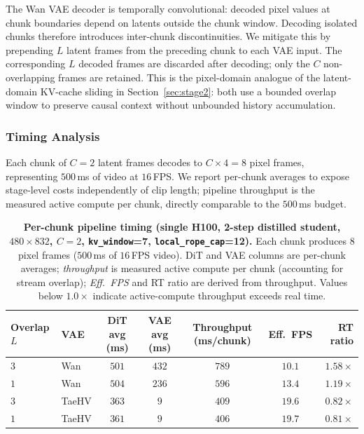 The Wan VAE decoder is temporally convolutional: decoded pixel values at chunk boundaries depend on latents outside the chunk window. Decoding isolated chunks therefore introduces inter-chunk discontinuities. We mitigate this by prepending $L$ latent frames from the preceding chunk to each VAE input. The corresponding $L$ decoded frames are discarded after decoding; only the $C$ non-overlapping frames are retained. This is the pixel-domain analogue of the latent-domain KV-cache sliding in Section~\ref{sec:stage2}: both use a bounded overlap window to preserve causal context without unbounded history accumulation.

\subsubsection{Timing Analysis}

Each chunk of $C{=}2$ latent frames decodes to $C \times 4 = 8$ pixel frames, representing $500$\,ms of video at $16$\,FPS. We report per-chunk averages to expose stage-level costs independently of clip length; pipeline throughput is the measured active compute per chunk, directly comparable to the $500$\,ms budget.

\begin{table}[h]
  \caption{\textbf{Per-chunk pipeline timing (single H100, 2-step distilled student, $480{\times}832$, $C{=}2$, \texttt{kv\_window}{=}7, \texttt{local\_rope\_cap}{=}12).} Each chunk produces $8$ pixel frames ($500$\,ms of $16$\,FPS video). DiT and VAE columns are per-chunk averages; \emph{throughput} is measured active compute per chunk (accounting for stream overlap); \emph{Eff.\ FPS} and RT ratio are derived from throughput. Values below $1.0\times$ indicate active-compute throughput exceeds real time.}
  \label{tab:pipeline_timing}
  \centering
  \small
  \setlength{\tabcolsep}{5pt}
  \begin{tabular}{llccccr}
    \toprule
    Overlap $L$ & VAE & DiT avg (ms) & VAE avg (ms) & Throughput (ms/chunk) & Eff.\ FPS & RT ratio \\
    \midrule
    $3$ & Wan   & $501$ & $432$ & $789$ & $10.1$ & $1.58\times$ \\
    $1$ & Wan   & $504$ & $236$ & $596$ & $13.4$ & $1.19\times$ \\
    $3$ & TaeHV & $363$ & $9$ & $409$ & $19.6$ & $0.82\times$ \\
    $1$ & TaeHV & $361$ & $9$ & $406$ & $\mathbf{19.7}$ & $\mathbf{0.81\times}$ \\
    \bottomrule
  \end{tabular}
\end{table}

